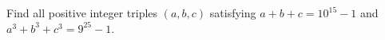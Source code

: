 Find all positive integer triples $(a,b,c)$ satisfying $a+b+c=10^{15}-1$ and $a^3+b^3+c^3=9^{25}-1$.
